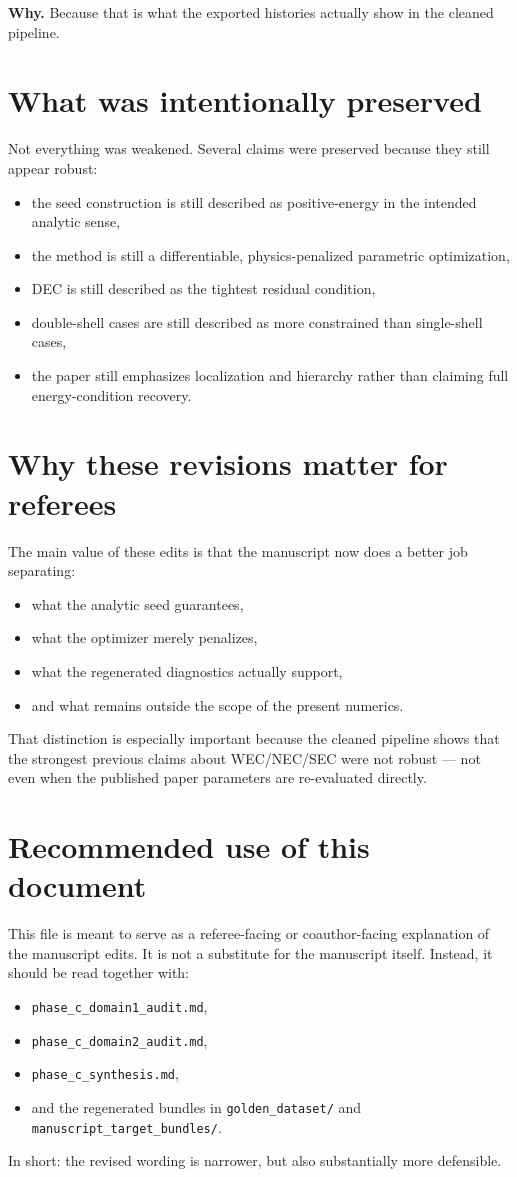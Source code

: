 \documentclass[11pt]{article}
\begin{document}
\textbf{Why.}
Because that is what the exported histories actually show in the cleaned pipeline.

\section*{What was intentionally preserved}
Not everything was weakened. Several claims were preserved because they still appear robust:
\begin{itemize}[leftmargin=*]
\item the seed construction is still described as positive-energy in the intended analytic sense,
\item the method is still a differentiable, physics-penalized parametric optimization,
\item DEC is still described as the tightest residual condition,
\item double-shell cases are still described as more constrained than single-shell cases,
\item the paper still emphasizes localization and hierarchy rather than claiming full energy-condition recovery.
\end{itemize}

\section*{Why these revisions matter for referees}
The main value of these edits is that the manuscript now does a better job separating:
\begin{itemize}[leftmargin=*]
\item what the analytic seed guarantees,
\item what the optimizer merely penalizes,
\item what the regenerated diagnostics actually support,
\item and what remains outside the scope of the present numerics.
\end{itemize}

That distinction is especially important because the cleaned pipeline shows that the strongest previous
claims about WEC/NEC/SEC were not robust --- not even when the published paper parameters are
re-evaluated directly.

\section*{Recommended use of this document}
This file is meant to serve as a referee-facing or coauthor-facing explanation of the manuscript edits.
It is not a substitute for the manuscript itself. Instead, it should be read together with:
\begin{itemize}[leftmargin=*]
\item \texttt{phase\_c\_domain1\_audit.md},
\item \texttt{phase\_c\_domain2\_audit.md},
\item \texttt{phase\_c\_synthesis.md},
\item and the regenerated bundles in \texttt{golden\_dataset/} and \texttt{manuscript\_target\_bundles/}.
\end{itemize}

In short: the revised wording is narrower, but also substantially more defensible.
\end{document}
